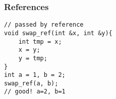 
\begin{frame}
\end{frame}


\begin{frame}[fragile]
\frametitle{References}
\begin{lstlisting}
// passed by reference
void swap_ref(int &x, int &y){
    int tmp = x;
    x = y;
    y = tmp;
}
int a = 1, b = 2;
swap_ref(a, b);
// good! a=2, b=1
\end{lstlisting}
\end{frame}
